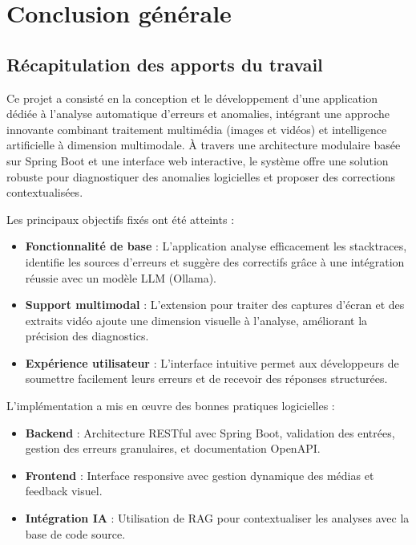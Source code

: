 \documentclass[12pt,a4paper]{report}
\begin{document}
	\chapter*{Conclusion générale}
	
	\section*{Récapitulation des apports du travail}
	
	Ce projet a consisté en la conception et le développement d'une application dédiée à l'analyse automatique d'erreurs et anomalies, intégrant une approche innovante combinant traitement multimédia (images et vidéos) et intelligence artificielle à dimension multimodale. À travers une architecture modulaire basée sur Spring Boot et une interface web interactive, le système offre une solution robuste pour diagnostiquer des anomalies logicielles et proposer des corrections contextualisées.
	
	Les principaux objectifs fixés ont été atteints :  
	
	\begin{itemize}
		
		\item \textbf{Fonctionnalité de base} : L'application analyse efficacement les stacktraces,  identifie les sources d'erreurs et suggère des correctifs grâce à une intégration réussie avec un modèle LLM (Ollama).
		
		\item \textbf{Support multimodal} : L'extension pour traiter des captures d'écran et des extraits vidéo ajoute une dimension visuelle à l'analyse, améliorant la précision des diagnostics.
		
		\item \textbf{Expérience utilisateur} : L'interface intuitive permet aux développeurs de soumettre facilement leurs erreurs et de recevoir des réponses structurées.
		
	\end{itemize}

	L'implémentation a mis en œuvre des bonnes pratiques logicielles :
	
	\begin{itemize}
		
		\item \textbf{Backend} : Architecture RESTful avec Spring Boot, validation des entrées, gestion des erreurs granulaires, et documentation OpenAPI.
		
		\item \textbf{Frontend} : Interface responsive avec gestion dynamique des médias et feedback visuel.
		
		\item \textbf{Intégration IA} : Utilisation de RAG pour contextualiser les analyses avec la base de code source. 
		
	\end{itemize}
	
\end{document}
